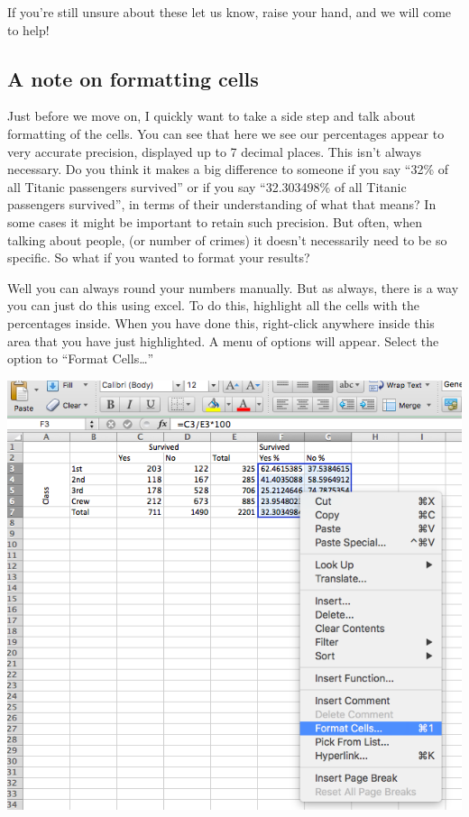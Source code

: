 \documentclass[]{book}
\theoremstyle{definition}
\theoremstyle{definition}
\theoremstyle{definition}
\theoremstyle{remark}
\begin{document}
If you're still unsure about these let us know, raise your hand, and we
will come to help!

\hypertarget{a-note-on-formatting-cells}{%
\subsection{A note on formatting
cells}\label{a-note-on-formatting-cells}}

Just before we move on, I quickly want to take a side step and talk
about formatting of the cells. You can see that here we see our
percentages appear to very accurate precision, displayed up to 7 decimal
places. This isn't always necessary. Do you think it makes a big
difference to someone if you say ``32\% of all Titanic passengers
survived'' or if you say ``32.303498\% of all Titanic passengers
survived'', in terms of their understanding of what that means? In some
cases it might be important to retain such precision. But often, when
talking about people, (or number of crimes) it doesn't necessarily need
to be so specific. So what if you wanted to format your results?

Well you can always round your numbers manually. But as always, there is
a way you can just do this using excel. To do this, highlight all the
cells with the percentages inside. When you have done this, right-click
anywhere inside this area that you have just highlighted. A menu of
options will appear. Select the option to ``Format Cells\ldots{}''

\includegraphics{imgs/format_cells.png}
\end{document}
